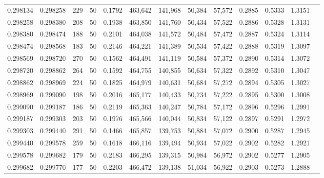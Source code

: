 \begin{tabular}{rrrrrrrrrrrrr}
0.298134 & 0.298258 &   229 &  50 &                                     0.1792 & 463,642 & 141,968 &  50,384 &  57,572 & 0.2885 & 0.5333 & 1.3151 \\
0.298258 & 0.298380 &   208 &  50 &                                     0.1938 & 463,850 & 141,760 &  50,434 &  57,522 & 0.2886 & 0.5328 & 1.3131 \\
0.298380 & 0.298474 &   188 &  50 &                                     0.2101 & 464,038 & 141,572 &  50,484 &  57,472 & 0.2887 & 0.5324 & 1.3114 \\
0.298474 & 0.298568 &   183 &  50 &                                     0.2146 & 464,221 & 141,389 &  50,534 &  57,422 & 0.2888 & 0.5319 & 1.3097 \\
0.298569 & 0.298720 &   270 &  50 &                                     0.1562 & 464,491 & 141,119 &  50,584 &  57,372 & 0.2890 & 0.5314 & 1.3072 \\
0.298720 & 0.298862 &   264 &  50 &                                     0.1592 & 464,755 & 140,855 &  50,634 &  57,322 & 0.2892 & 0.5310 & 1.3047 \\
0.298862 & 0.298969 &   224 &  50 &                                     0.1825 & 464,979 & 140,631 &  50,684 &  57,272 & 0.2894 & 0.5305 & 1.3027 \\
0.298969 & 0.299090 &   198 &  50 &                                     0.2016 & 465,177 & 140,433 &  50,734 &  57,222 & 0.2895 & 0.5300 & 1.3008 \\
0.299090 & 0.299187 &   186 &  50 &                                     0.2119 & 465,363 & 140,247 &  50,784 &  57,172 & 0.2896 & 0.5296 & 1.2991 \\
0.299187 & 0.299303 &   203 &  50 &                                     0.1976 & 465,566 & 140,044 &  50,834 &  57,122 & 0.2897 & 0.5291 & 1.2972 \\
0.299303 & 0.299440 &   291 &  50 &                                     0.1466 & 465,857 & 139,753 &  50,884 &  57,072 & 0.2900 & 0.5287 & 1.2945 \\
0.299440 & 0.299578 &   259 &  50 &                                     0.1618 & 466,116 & 139,494 &  50,934 &  57,022 & 0.2902 & 0.5282 & 1.2921 \\
0.299578 & 0.299682 &   179 &  50 &                                     0.2183 & 466,295 & 139,315 &  50,984 &  56,972 & 0.2902 & 0.5277 & 1.2905 \\
0.299682 & 0.299770 &   177 &  50 &                                     0.2203 & 466,472 & 139,138 &  51,034 &  56,922 & 0.2903 & 0.5273 & 1.2888 \\

\end{tabular}
